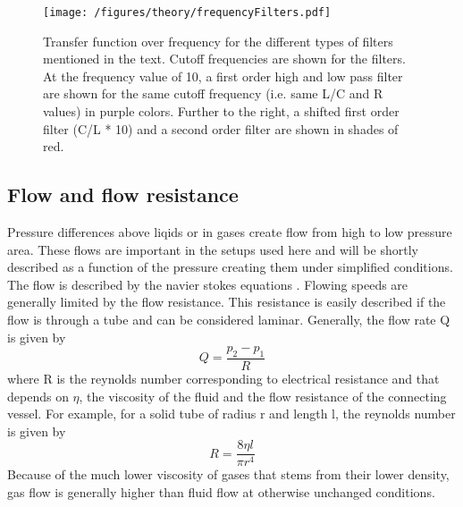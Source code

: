             \begin{figure}
                \label{figure:theory:frequencyFilter}
                \centering
                \texttt{[image: /figures/theory/frequencyFilters.pdf]}
                \caption[Frequency filters]{Transfer function over frequency for the different types of filters mentioned in the text. Cutoff frequencies are shown for the filters. At the frequency value of 10, a first order high and low pass filter are shown for the same cutoff frequency (i.e. same L/C and R values) in purple colors. Further to the right, a shifted first order filter (C/L * 10) and a second order filter are shown in shades of red.}
            \end{figure}
            \subsection{Flow and flow resistance}
                Pressure differences above liqids or in gases create flow from high to low pressure area. These flows are important in the setups used here and will be shortly described as a function of the pressure creating them under simplified conditions. The flow is described by the navier stokes equations \cite{sochi_flow_2013}.
                Flowing speeds are generally limited by the flow resistance. This resistance is easily described if the flow is through a tube and can be considered laminar. Generally, the flow rate Q is given by 
                \begin{equation}
                    Q=\frac{p_2-p_1}{R}
                \end{equation}
                where R is the reynolds number corresponding to electrical resistance and that depends on $\eta$, the viscosity of the fluid and the flow resistance of the connecting vessel. For example, for a solid tube of radius r and length l, the reynolds number is given by \cite{jeffrey_particle_1965}
                \begin{equation}
                    R=\frac{8\eta l}{\pi r^4}
                \end{equation}
                Because of the much lower viscosity of gases that stems from their lower density, gas flow is generally higher than fluid flow at otherwise unchanged conditions.
